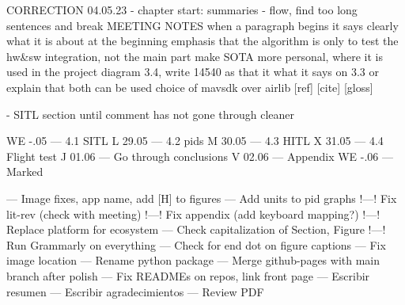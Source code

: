 CORRECTION 04.05.23
 - chapter start: summaries
 - flow, find too long sentences and break
 MEETING NOTES
when a paragraph begins it says clearly what it is about at the beginning
emphasis that the algorithm is only to test the hw&sw integration, not the main part
make SOTA more personal, where it is used in the project
diagram 3.4, write 14540 as that it what it says on 3.3 or explain that both can be used
choice of mavsdk over airlib
[ref] [cite] [gloss]

- SITL section until comment has not gone through cleaner

 

WE -.05 --- 4.1 SITL
L 29.05 --- 4.2 pids
M 30.05 --- 4.3 HITL
X 31.05 --- 4.4 Flight test
J 01.06 --- Go through conclusions
V 02.06 --- Appendix
WE -.06 --- Marked

        --- Image fixes, app name, add [H] to figures
        --- Add units to pid graphs
        !---! Fix lit-rev (check with meeting)
        !---! Fix appendix (add keyboard mapping?)
        !---! Replace platform for ecosystem
        --- Check capitalization of Section, Figure
        !---! Run Grammarly on everything
        --- Check for end dot on figure captions
        --- Fix image location
        --- Rename python package
        --- Merge github-pages with main branch after polish
        --- Fix READMEs on repos, link front page
        --- Escribir resumen
        --- Escribir agradecimientos
        --- Review PDF